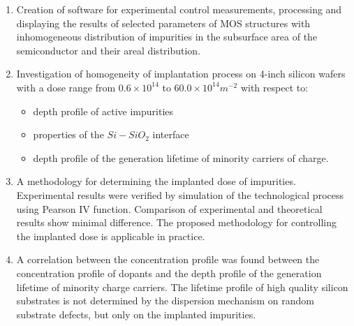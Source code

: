 \begin{enumerate}
\item Creation of software for experimental control measurements,
  processing and displaying the results of selected parameters of MOS
  structures with inhomogeneous distribution of impurities in the
  subsurface area of the semiconductor and their areal distribution.

\item Investigation of homogeneity of implantation process on 4-inch
  silicon wafers with a dose range from $0.6 \times 10^{14}$ to $60.0
  \times 10^{14} m^{-2}$ with respect to:

  \begin{itemize}
  \item depth profile of active impurities
  \item properties of the $Si-SiO_{2}$ interface
  \item depth profile of the generation lifetime of minority carriers
    of charge.
  \end{itemize}

\item A methodology for determining the implanted dose of
  impurities. Experimental results were verified by simulation of the
  technological process using Pearson IV function. Comparison of
  experimental and theoretical results show minimal difference. The
  proposed methodology for controlling the implanted dose is
  applicable in practice.

\item A correlation between the concentration profile was found
  between the concentration profile of dopants and the depth profile
  of the generation lifetime of minority charge carriers. The lifetime
  profile of high quality silicon substrates is not determined by the
  dispersion mechanism on random substrate defects, but only on the
  implanted impurities.

\end{enumerate}
